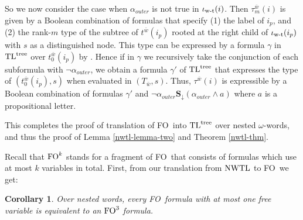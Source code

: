 \documentclass{LMCS}
\newcommand{\OMIT}[1]{}
\newcommand{\w}{{\bar{w}}}
\newcommand{\X}{{\mathbf X}}
\newcommand{\U}{{\mathbf U}}
\renewcommand{\S}{{\mathbf S}}
\newcommand{\next}{\text{\raisebox{1pt}{$\bigcirc$}}}
\renewcommand{\X}{\next}
\newcommand{\Yd}{\X_{\!\uparrow}}
\newcommand{\Sd}{\S_{\!\downarrow}}
\newcommand{\FO}{{\rm FO}}
\renewcommand{\phi}{\varphi}
\newcommand{\fth}{\hfill $\Box$}
\newcommand{\wt}{\iota_{\text{\rm w-t}}}
\newcommand{\crc}[1]{#1^\circ}
\theoremstyle{plain}
\newtheorem{corollary}[theorem]{Corollary}
\theoremstyle{definition}
\newcommand{\ppath}{\sigma} \newcommand{\Ul}{\U}
\newcommand{\Up}{\U^\ppath}
\newcommand{\Sp}{\S^\ppath}
\newcommand{\Us}{\Up_s}
\newcommand{\Ss}{\Sp_s}
\newcommand{\Uss}{\Up_{ss}}
\newcommand{\nwtls}{\nwtl^s}
\newcommand{\tltree}{\text{\rm TL}^{\text{\rm tree}}}
\newcommand{\sright}{s^{\rightarrow}}
\begin{document}
{ So we now consider the case when $\alpha_{outer}$ is 
not true in $\wt(i)$. Then $\tau_m^\w(i)$ 
is given by a Boolean combination of formulas that specify (1)
the label of $i_p$, and (2) the rank-$m$ type of the subtree of
$t^\w(i_p)$ rooted at the right child of $\wt(i_p)$ with $s$ as a 
distinguished node. This type can be expressed by a formula $\gamma$
in $\tltree$ over $t^\w_0(i_p)$ by \cite{marx-pods04}. Hence if in
$\gamma$ we recursively take the conjunction of each subformula with
$\neg\alpha_{outer}$, we obtain a formula $\gamma'$ of $\tltree$ that
expresses the type of $(t^\w_0(i_p),s)$ when evaluated in
$(T_\w,s)$. Thus, $\tau^\w(i)$ is expressible by a Boolean combination
of formulas $\gamma'$ and $\neg\alpha_{outer}\Sd (\alpha_{outer}
\wedge a)$ where $a$ is a propositional letter.

This completes the proof of translation of \FO\ into $\tltree$ over
nested $\omega$-words, and thus the proof of Lemma
\ref{nwtl-lemma-two} and 
Theorem \ref{nwtl-thm}.}


Recall that $\FO^k$ stands for a fragment of \FO\ that consists of
formulas which use at most $k$ variables in total.
First, from our
translation from $\nwtl$ to \FO\ we get:
\begin{corollary}
Over nested words,
every \FO\ formula with at most one free variable is equivalent to an
$\FO^3$ formula.
\end{corollary}


\OMIT{

Furthermore, for \FO\ {\em sentences}, we can eliminate the since operator.


\begin{corollary}
\label{nwtl-cor}
For every \FO\ sentence $\Phi$ over finite or infinite nested words,
there is a formula $\phi$ of $\nwtl$ that does not use the since
operator $\Sp$ such that $\w\models \Phi$ iff $(\w,1)\models\phi$.
\end{corollary}

{\em Proof}. 
In the proof of Theorem \ref{nwtl-thm}, we show that every \FO\
sentence over a nested word $\w$ can be translated into an
\FO\ sentence over the tree $T_\w$, and then, by the separation property
of $\tltree$ \cite{marx-pods04} is equivalent to a $\tltree$ formula
that does not use $\Sd$ and $\Yd$. Then, given that in the translation
of $\tltree$ into $\nwtls$ we only use $\Ss$ in the rule
$\crc{(\phi\Sd\psi)} = \crc\phi\Ss\crc\psi$, we see that the
equivalent $\nwtls$ formula does not use $\Ss$. Thus, given that in the
proof of Lemma \ref{nwtl-lemma-one}, no since operator is used in the
translations of $\Us$ into $\Uss$ and $\Uss$ into $\Up$, the
corollary follows for the finite case.

For the infinite case, we note that in the proof of Theorem
\ref{nwtl-thm}, for the case of \FO\ sentences we only need to specify
the type of $\sright_m(\w,s)$ where $s$ is the root. Thus, one can see
that in this case the use of $\Sd$ in $\tltree$ formulas is not
required, and hence the resulting formulas are translated into
$\nwtls$ formulas without $\Ss$.
\fth
}
\end{document}
